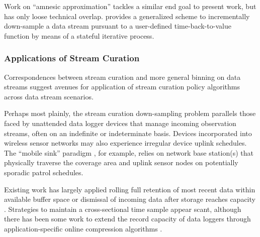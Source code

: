 Work on ``amnesic approximation'' tackles a similar end goal to present work, but has only loose technical overlap.
\cite{palpanas2004online} provides a generalized scheme to incrementally down-sample a data stream pursuant to a user-defined time-back-to-value function by means of a stateful iterative process.

\subsubsection{Applications of Stream Curation}

Correspondences between stream curation and more general binning on data streams suggest avenues for application of stream curation policy algorithms across data stream scenarios.

Perhaps most plainly, the stream curation down-sampling problem parallels those faced by unattended data logger devices that manage incoming observation streams, often on an indefinite or indeterminate basis.
Devices incorporated into wireless sensor networks may also experience irregular device uplink schedules.
The ``mobile sink'' paradigm \citep{jain2022survey}, for example, relies on network base station(s) that physically traverse the coverage area and uplink sensor nodes on potentially sporadic patrol schedules.

Existing work has largely applied rolling full retention of most recent data within available buffer space \citep{fincham1995use} or dismissal of incoming data after storage reaches capacity \citep{saunders1989portable,mahzan2017design}.
Strategies to maintain a cross-sectional time sample appear scant, although there has been some work to extend the record capacity of data loggers through application-specific online compression algorithms \citep{hadiatna2016design}.
